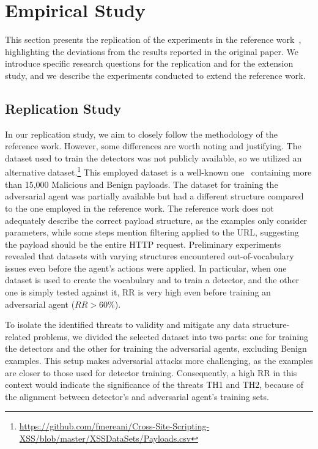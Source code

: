 \section{Empirical Study}
\label{sec:empirical_study}


This section presents the replication of the experiments in the reference work~\cite{CHEN2022102831}, highlighting the deviations from the results reported in the original paper. We introduce specific research questions for the replication and for the extension study, and we describe the experiments conducted to extend the reference work.


\subsection{Replication Study}
\label{sec:replication_study}

In our replication study, we aim to closely follow the methodology of the reference work. However, some differences are worth noting and justifying. The dataset used to train the detectors was not publicly available, so we utilized an alternative dataset.\footnote{\url{https://github.com/fmereani/Cross-Site-Scripting-XSS/blob/master/XSSDataSets/Payloads.csv}}
This employed dataset is a well-known one~\cite{10.1007/978-3-319-74690-6_20} containing more than 15,000 Malicious and Benign payloads. The dataset for training the adversarial agent was partially available but had a different structure compared to the  one employed in the reference work. The reference work does not adequately describe the correct payload structure, as the examples only consider parameters, while some steps mention filtering applied to the URL, suggesting the payload should be the entire HTTP request. Preliminary experiments revealed that datasets with varying structures encountered out-of-vocabulary issues even before the agent's actions were applied.
In particular, when one dataset is used to create the vocabulary and to train a detector, and the other one is simply tested against it,  RR is very high even before training an adversarial agent ($RR>60\%$).


To isolate the identified threats to validity and mitigate any data structure-related problems, we divided the selected dataset into two parts: one for training the detectors and the other for training the adversarial agents, excluding Benign examples. This setup makes adversarial attacks more challenging, as the examples are closer to those used for detector training. Consequently, a high RR in this context would indicate the significance of the threats TH1 and TH2, because of the alignment between detector's and adversarial agent's training sets. %

